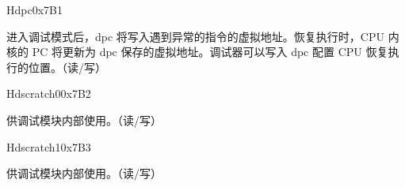 \begin{register}{H}{dpc}{0x7B1}
\label{regdesc:DPC}
%
\regnewline%
\begin{regdesc}
\begin{reglist}
\label{fielddesc:DPC}\item [dpc] 进入调试模式后，dpc 将写入遇到异常的指令的虚拟地址。恢复执行时，CPU 内核的 PC 将更新为 dpc 保存的虚拟地址。调试器可以写入 dpc 配置 CPU 恢复执行的位置。（读/写）
\end{reglist}
\end{regdesc}
\end{register}

\begin{register}{H}{dscratch0}{0x7B2}
\label{regdesc:DSCRATCH0}
%
\regnewline%
\begin{regdesc}
\begin{reglist}
\label{fielddesc:DSCRATCH0}\item [dscratch0] 供调试模块内部使用。（读/写）
\end{reglist}
\end{regdesc}
\end{register}

\begin{register}{H}{dscratch1}{0x7B3}
\label{regdesc:DSCRATCH1}
%
\regnewline%
\begin{regdesc}
\begin{reglist}
\label{fielddesc:DSCRATCH1}\item [dscratch1] 供调试模块内部使用。（读/写）
\end{reglist}
\end{regdesc}
\end{register}
